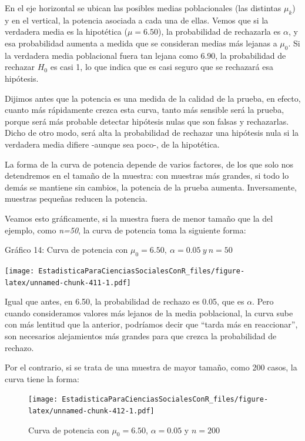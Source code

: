 \documentclass[]{book}
\begin{document}
En el eje horizontal se ubican las posibles medias poblacionales (las
distintas \(\mu_{k}\)) y en el vertical, la potencia asociada a cada una
de ellas. Vemos que si la verdadera media es la hipotética
(\(\mu = 6.50\)), la probabilidad de rechazarla es \(\alpha\), y esa probabilidad
aumenta a medida que se consideran medias más lejanas a \(\mu_{0}\). Si la
verdadera media poblacional fuera tan lejana como 6.90, la probabilidad
de rechazar \(H_{0}\) es casi 1, lo que indica que es casi seguro que se
rechazará esa hipótesis.

Dijimos antes que la potencia es una medida de la calidad de la prueba,
en efecto, cuanto más rápidamente crezca esta curva, tanto más sensible
será la prueba, porque será más probable detectar hipótesis nulas que
son falsas y rechazarlas. Dicho de otro modo, será alta la probabilidad
de rechazar una hipótesis nula si la verdadera media difiere -aunque sea
poco-, de la hipotética.

La forma de la curva de potencia depende de varios factores, de los que
solo nos detendremos en el tamaño de la muestra: con muestras más
grandes, si todo lo demás se mantiene sin cambios, la potencia de la
prueba aumenta. Inversamente, muestras pequeñas reducen la potencia.

Veamos esto gráficamente, si la muestra fuera de menor tamaño que la del ejemplo, como \emph{n=50}, la curva de potencia toma la siguiente forma:

Gráfico 14: Curva de potencia con
\(\mu_{0} = 6.50,\ \alpha = 0.05\ y\ n = 50\)

\texttt{[image: EstadisticaParaCienciasSocialesConR\_files/figure-latex/unnamed-chunk-411-1.pdf]}

Igual que antes, en 6.50, la probabilidad de rechazo es 0.05, que es \(\alpha\).
Pero cuando consideramos valores más lejanos de la media poblacional, la
curva sube con más lentitud que la anterior, podríamos decir que ``tarda
más en reaccionar'', son necesarios alejamientos más grandes para que
crezca la probabilidad de rechazo.

Por el contrario, si se trata de una muestra de mayor tamaño, como 200
casos, la curva tiene la forma:

\begin{figure}
\centering
\texttt{[image: EstadisticaParaCienciasSocialesConR\_files/figure-latex/unnamed-chunk-412-1.pdf]}
\caption{\label{fig:unnamed-chunk-412}Curva de potencia con \(\mu_{0} = 6.50\), \(\alpha = 0.05\) y \(n = 200\)}
\end{figure}
\end{document}
